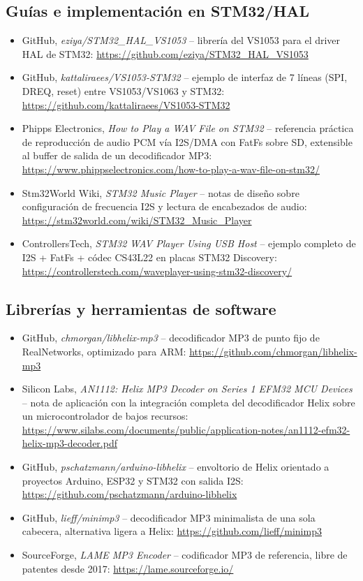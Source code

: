 \documentclass[pdflatex,sn-mathphys-num]{sn-jnl}%
\begin{document}
\subsection{Guías e implementación en STM32/HAL}
\begin{itemize}
    \item GitHub, \textit{eziya/STM32\_HAL\_VS1053} -- librería del VS1053 para el driver HAL de STM32: \url{https://github.com/eziya/STM32_HAL_VS1053}
    \item GitHub, \textit{kattaliraees/VS1053-STM32} -- ejemplo de interfaz de 7 líneas (SPI, DREQ, reset) entre VS1053/VS1063 y STM32: \url{https://github.com/kattaliraees/VS1053-STM32}
    \item Phipps Electronics, \textit{How to Play a WAV File on STM32} -- referencia práctica de reproducción de audio PCM vía I2S/DMA con FatFs sobre SD, extensible al buffer de salida de un decodificador MP3: \url{https://www.phippselectronics.com/how-to-play-a-wav-file-on-stm32/}
    \item Stm32World Wiki, \textit{STM32 Music Player} -- notas de diseño sobre configuración de frecuencia I2S y lectura de encabezados de audio: \url{https://stm32world.com/wiki/STM32_Music_Player}
    \item ControllersTech, \textit{STM32 WAV Player Using USB Host} -- ejemplo completo de I2S + FatFs + códec CS43L22 en placas STM32 Discovery: \url{https://controllerstech.com/waveplayer-using-stm32-discovery/}
\end{itemize}

\subsection{Librerías y herramientas de software}
\begin{itemize}
    \item GitHub, \textit{chmorgan/libhelix-mp3} -- decodificador MP3 de punto fijo de RealNetworks, optimizado para ARM: \url{https://github.com/chmorgan/libhelix-mp3}
    \item Silicon Labs, \textit{AN1112: Helix MP3 Decoder on Series 1 EFM32 MCU Devices} -- nota de aplicación con la integración completa del decodificador Helix sobre un microcontrolador de bajos recursos: \url{https://www.silabs.com/documents/public/application-notes/an1112-efm32-helix-mp3-decoder.pdf}
    \item GitHub, \textit{pschatzmann/arduino-libhelix} -- envoltorio de Helix orientado a proyectos Arduino, ESP32 y STM32 con salida I2S: \url{https://github.com/pschatzmann/arduino-libhelix}
    \item GitHub, \textit{lieff/minimp3} -- decodificador MP3 minimalista de una sola cabecera, alternativa ligera a Helix: \url{https://github.com/lieff/minimp3}
    \item SourceForge, \textit{LAME MP3 Encoder} -- codificador MP3 de referencia, libre de patentes desde 2017: \url{https://lame.sourceforge.io/}
\end{itemize}
\end{document}
